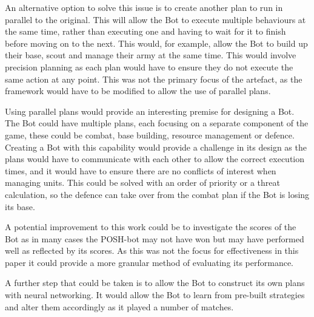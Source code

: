 \documentclass[journal]{IEEEtran}
\begin{document}
	An alternative option to solve this issue is to create another plan to run in parallel to the original. This will allow the Bot to execute multiple behaviours at the same time, rather than executing one and having to wait for it to finish before moving on to the next. This would, for example, allow the Bot to build up their base, scout and manage their army at the same time. This would involve precision planning as each plan would have to ensure they do not execute the same action at any point. This was not the primary focus of the artefact, as the framework would have to be modified to allow the use of parallel plans.
	
	Using parallel plans would provide an interesting premise for designing a Bot. The Bot could have multiple plans, each focusing on a separate component of the game, these could be combat, base building, resource management or defence. Creating a Bot with this capability would provide a challenge in its design as the plans would have to communicate with each other to allow the correct execution times, and it would have to ensure there are no conflicts of interest when managing units. This could be solved with an order of priority or a threat calculation, so the defence can take over from the combat plan if the Bot is losing its base.
	
	A potential improvement to this work could be to investigate the scores of the Bot as in many cases the POSH-bot may not have won but may have performed well as reflected by its scores. As this was not the focus for effectiveness in this paper it could provide a more granular method of evaluating its performance. 
	
	A further step that could be taken is to allow the Bot to construct its own plans with neural networking. It would allow the Bot to learn from pre-built strategies and alter them accordingly as it played a number of matches.
	
\end{document}
